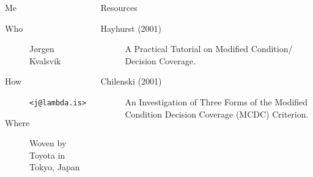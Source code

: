 \documentclass[xcolor = {dvipsnames, table}, aspectratio=169]{beamer}
\begin{document}
\begin{frame}
    \begin{columns}
        \begin{column}[T]{0.5\textwidth}
            \begin{block}{Me}
                \begin{description}
                    \item [Who] Jørgen Kvalsvik
                    \item [How] \lstinline{<j@lambda.is>}
                    \item [Where] Woven by Toyota in Tokyo, Japan
                \end{description}
            \end{block}
        \end{column}

        \begin{column}[T]{0.5\textwidth}
            \begin{block}{Resources}
                \begin{description}
                    \item [Hayhurst (2001)] A Practical Tutorial on Modified
                        Condition/ Decision Coverage.
                    \item [Chilenski (2001)] An Investigation of Three Forms of
                        the Modified Condition Decision Coverage (MCDC)
                        Criterion.
                \end{description}
            \end{block}
        \end{column}
    \end{columns}
\end{frame}
\end{document}
